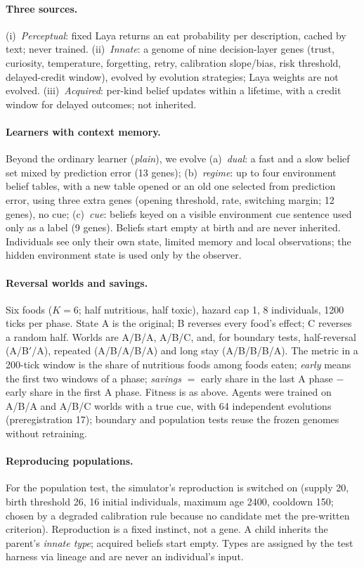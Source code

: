\documentclass[11pt]{article}
\begin{document}
\paragraph{Three sources.} (i)~\emph{Perceptual}: fixed Laya \citep{laya2026} returns an eat probability per description, cached by text; never trained. (ii)~\emph{Innate}: a genome of nine decision-layer genes (trust, curiosity, temperature, forgetting, retry, calibration slope/bias, risk threshold, delayed-credit window), evolved by evolution strategies; Laya weights are not evolved. (iii)~\emph{Acquired}: per-kind belief updates within a lifetime, with a credit window for delayed outcomes; not inherited.

\paragraph{Learners with context memory.} Beyond the ordinary learner (\emph{plain}), we evolve (a)~\emph{dual}: a fast and a slow belief set mixed by prediction error (13 genes); (b)~\emph{regime}: up to four environment belief tables, with a new table opened or an old one selected from prediction error, using three extra genes (opening threshold, rate, switching margin; 12 genes), no cue; (c)~\emph{cue}: beliefs keyed on a visible environment cue sentence used only as a label (9 genes). Beliefs start empty at birth and are never inherited. Individuals see only their own state, limited memory and local observations; the hidden environment state is used only by the observer.

\paragraph{Reversal worlds and savings.} Six foods ($K=6$; half nutritious, half toxic), hazard cap 1, 8 individuals, 1200 ticks per phase. State A is the original; B reverses every food's effect; C reverses a random half. Worlds are A/B/A, A/B/C, and, for boundary tests, half-reversal (A/B$'$/A), repeated (A/B/A/B/A) and long stay (A/B/B/B/A). The metric in a 200-tick window is the share of nutritious foods among foods eaten; \emph{early} means the first two windows of a phase; \emph{savings} $=$ early share in the last A phase $-$ early share in the first A phase. Fitness is as above. Agents were trained on A/B/A and A/B/C worlds with a true cue, with 64 independent evolutions (preregistration 17); boundary and population tests reuse the frozen genomes without retraining.

\paragraph{Reproducing populations.} For the population test, the simulator's reproduction is switched on (supply 20, birth threshold 26, 16 initial individuals, maximum age 2400, cooldown 150; chosen by a degraded calibration rule because no candidate met the pre-written criterion). Reproduction is a fixed instinct, not a gene. A child inherits the parent's \emph{innate type}; acquired beliefs start empty. Types are assigned by the test harness via lineage and are never an individual's input.
\end{document}
